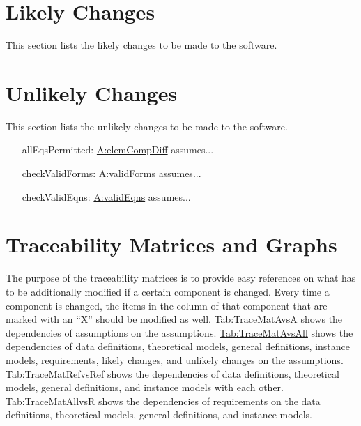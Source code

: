 \documentclass[12pt]{article}
\begin{document}
\section{Likely Changes}
\label{Sec:LCs}
This section lists the likely changes to be made to the software.

\section{Unlikely Changes}
\label{Sec:UCs}
This section lists the unlikely changes to be made to the software.

\begin{itemize}
\item[allEqsPermitted:\phantomsection\label{allEqsPermitted}]{\hyperref[elemCompDiff]{A:elemCompDiff} assumes...}
\item[checkValidForms:\phantomsection\label{checkValidForms}]{\hyperref[validForms]{A:validForms} assumes...}
\item[checkValidEqns:\phantomsection\label{checkValidEqns}]{\hyperref[validEqns]{A:validEqns} assumes...}
\end{itemize}
\section{Traceability Matrices and Graphs}
\label{Sec:TraceMatrices}
The purpose of the traceability matrices is to provide easy references on what has to be additionally modified if a certain component is changed. Every time a component is changed, the items in the column of that component that are marked with an ``X'' should be modified as well. \hyperref[Table:TraceMatAvsA]{Tab:TraceMatAvsA} shows the dependencies of assumptions on the assumptions. \hyperref[Table:TraceMatAvsAll]{Tab:TraceMatAvsAll} shows the dependencies of data definitions, theoretical models, general definitions, instance models, requirements, likely changes, and unlikely changes on the assumptions. \hyperref[Table:TraceMatRefvsRef]{Tab:TraceMatRefvsRef} shows the dependencies of data definitions, theoretical models, general definitions, and instance models with each other. \hyperref[Table:TraceMatAllvsR]{Tab:TraceMatAllvsR} shows the dependencies of requirements on the data definitions, theoretical models, general definitions, and instance models.
\end{document}

